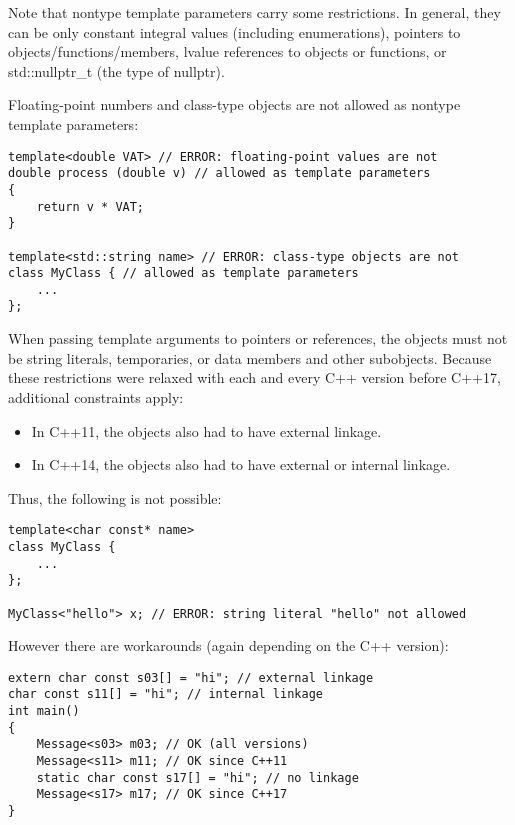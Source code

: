 Note that nontype template parameters carry some restrictions. In general, they can be only constant integral values (including enumerations), pointers to objects/functions/members, lvalue references to objects or functions, or std::nullptr\_t (the type of nullptr).

Floating-point numbers and class-type objects are not allowed as nontype template parameters:

\begin{lstlisting}[style=styleCXX]
template<double VAT> // ERROR: floating-point values are not
double process (double v) // allowed as template parameters
{
	return v * VAT;
}

template<std::string name> // ERROR: class-type objects are not
class MyClass { // allowed as template parameters
	...
};
\end{lstlisting}

When passing template arguments to pointers or references, the objects must not be string literals, temporaries, or data members and other subobjects. Because these restrictions were relaxed with each and every C++ version before C++17, additional constraints apply:

\begin{itemize}
\item 
In C++11, the objects also had to have external linkage.

\item 
In C++14, the objects also had to have external or internal linkage.
\end{itemize}

Thus, the following is not possible:

\begin{lstlisting}[style=styleCXX]
template<char const* name>
class MyClass {
	...
};

MyClass<"hello"> x; // ERROR: string literal "hello" not allowed
\end{lstlisting}

However there are workarounds (again depending on the C++ version):

\begin{lstlisting}[style=styleCXX]
extern char const s03[] = "hi"; // external linkage
char const s11[] = "hi"; // internal linkage
int main()
{
	Message<s03> m03; // OK (all versions)
	Message<s11> m11; // OK since C++11
	static char const s17[] = "hi"; // no linkage
	Message<s17> m17; // OK since C++17
}
\end{lstlisting}

